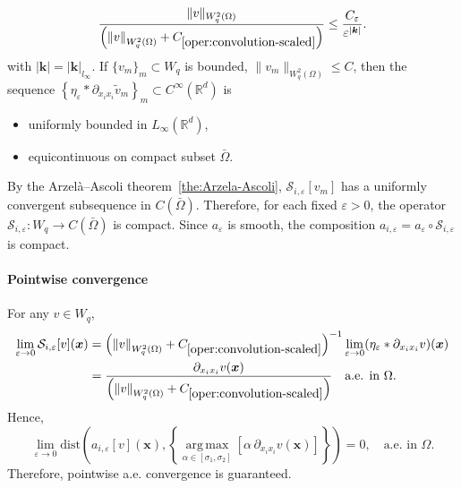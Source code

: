 \documentclass[final,onefignum,onetabnum]{mousaviart}
\newcounter{example}
\begin{document}
\begin{example}
\begin{equation}
\begin{aligned}
			\frac{\|v\|_{W^{2}_q(\Omega)}}{\left( \left\| v \right\|_{W^{2}_q(\Omega)} + C_{\ref{oper:convolution-scaled}} \right)}
			\le
			\frac{ C_{\varepsilon}}{{\varepsilon}^{|\boldsymbol{k}|}}
			.
		\end{aligned}
		\end{equation}
		{\color{red} with $|\boldsymbol{k}| = |\boldsymbol{k}|_{l_\infty}$.}
		If $\{v_m\}_m \subset W_q$ is bounded, $\|v_m\|_{W^{2}_q(\Omega)} \le C$, then the sequence $\left\lbrace \eta_{\varepsilon} \ast \partial_{x_i x_i} \tilde{v}_m \right\rbrace_m  \subset C^\infty(\mathbb{R}^d)$ is
		\begin{itemize}
			\item uniformly bounded in $L_\infty(\mathbb{R}^d)$,
			\item equicontinuous on compact subset $\bar{\Omega}$.
		\end{itemize}
		By the Arzelà–Ascoli theorem~\ref{the:Arzela-Ascoli}, $\mathcal{S}_{i,\varepsilon}[v_m]$ has a uniformly convergent subsequence in $C(\bar{\Omega})$.
		Therefore, 
		for each fixed $\varepsilon>0$, the operator $\mathcal{S}_{i,\varepsilon}: W_q \to C(\bar{\Omega})$ is compact. 
		Since $a_{\varepsilon}$ is smooth, the composition $a_{i,\varepsilon} = a_{\varepsilon} \circ \mathcal{S}_{i,\varepsilon}$ is compact.
		\paragraph{Pointwise convergence}  
		For any $v \in W_q$,
		\begin{equation}
		\label{limit:pointwise-S-scaled}
		\begin{aligned}
			\lim_{\varepsilon \to 0} \mathcal{S}_{i,\varepsilon}[v](\boldsymbol{x}) 
			&= 
			\left( \left\| v \right\|_{W^{2}_q(\Omega)} + C_{\ref{oper:convolution-scaled}} \right)^{-1}
			\lim_{\varepsilon \to 0} (\eta_\varepsilon \ast \partial_{x_i x_i} v)(\boldsymbol{x}) 
			\\
			&= 
			\frac{\partial_{x_i x_i} v(\boldsymbol{x})}{\left( \left\| v \right\|_{W^{2}_q(\Omega)} + C_{\ref{oper:convolution-scaled}} \right)}
			\quad \text{a.e. in } \Omega.
		\end{aligned}
	\end{equation}
		Hence,
		\begin{equation}
			\label{limit:pointwise-regularized-scaled}
			\lim_{\varepsilon \to 0}
			\text{dist}\left( 
			a_{i,\varepsilon}[v](\boldsymbol{x})
			,
			\left\lbrace  
			\operatorname*{arg\,max}_{\alpha \in [\sigma_1,\sigma_2]}
			\left[  \alpha\, \partial_{x_i x_i} v (\boldsymbol{x}) \right] \right\rbrace 
			\right) =0,
			\quad \text{a.e. in } \Omega.
		\end{equation}
		Therefore, pointwise a.e. convergence is guaranteed.

\end{example}
\end{document}
